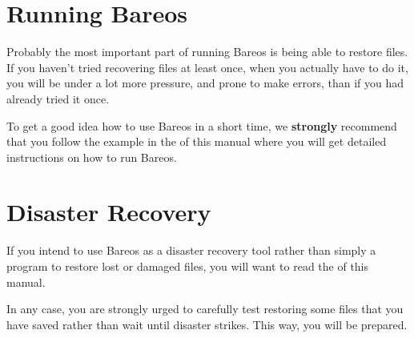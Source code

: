\label{Running1}

\section{Running Bareos}

Probably the most important part of running Bareos is being able to restore
files. If you haven't tried recovering files at least once, when you actually
have to do it, you will be under a lot more pressure, and prone to make
errors, than if you had already tried it once.

To get a good idea how to use Bareos in a short time, we {\bf strongly}
recommend that you follow the example in the
 of this manual where
you will get detailed instructions on how to run Bareos.




\section{Disaster Recovery}

If you intend to use Bareos as a disaster recovery tool rather than simply a
program to restore lost or damaged files, you will want to read the
 of
this manual.

In any case, you are strongly urged to carefully test restoring some files
that you have saved rather than wait until disaster strikes. This way, you
will be prepared.
